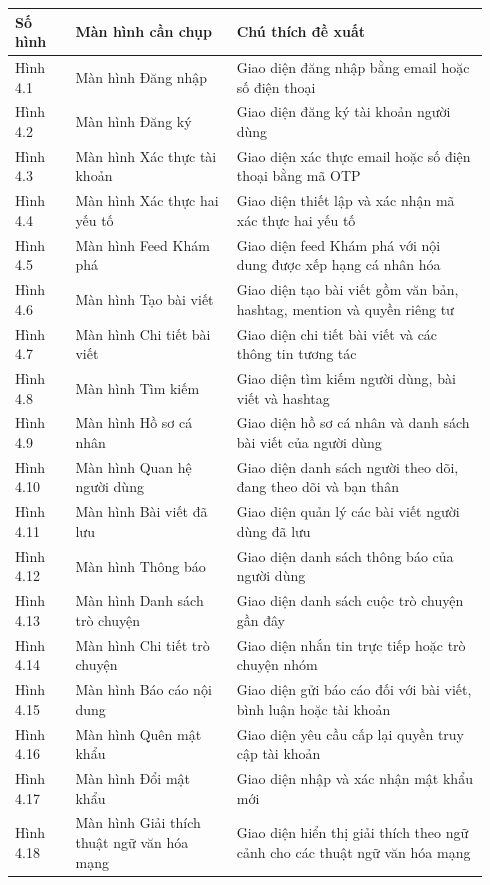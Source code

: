 {\def\LTcaptype{none}
\begin{longtable}{
  |>{\centering\arraybackslash}p{0.12\linewidth}
  |>{\raggedright\arraybackslash}p{0.32\linewidth}
  |>{\raggedright\arraybackslash}p{0.50\linewidth}|}
\hline
\textbf{Số hình} & \textbf{Màn hình cần chụp} & \textbf{Chú thích đề xuất} \\ \hline
\endhead
\hline
\endlastfoot
Hình 4.1 & Màn hình Đăng nhập & Giao diện đăng nhập bằng email hoặc số điện thoại \\ \hline
Hình 4.2 & Màn hình Đăng ký & Giao diện đăng ký tài khoản người dùng \\ \hline
Hình 4.3 & Màn hình Xác thực tài khoản & Giao diện xác thực email hoặc số điện thoại bằng mã OTP \\ \hline
Hình 4.4 & Màn hình Xác thực hai yếu tố & Giao diện thiết lập và xác nhận mã xác thực hai yếu tố \\ \hline
Hình 4.5 & Màn hình Feed Khám phá & Giao diện feed Khám phá với nội dung được xếp hạng cá nhân hóa \\ \hline
Hình 4.6 & Màn hình Tạo bài viết & Giao diện tạo bài viết gồm văn bản, hashtag, mention và quyền riêng tư \\ \hline
Hình 4.7 & Màn hình Chi tiết bài viết & Giao diện chi tiết bài viết và các thông tin tương tác \\ \hline
Hình 4.8 & Màn hình Tìm kiếm & Giao diện tìm kiếm người dùng, bài viết và hashtag \\ \hline
Hình 4.9 & Màn hình Hồ sơ cá nhân & Giao diện hồ sơ cá nhân và danh sách bài viết của người dùng \\ \hline
Hình 4.10 & Màn hình Quan hệ người dùng & Giao diện danh sách người theo dõi, đang theo dõi và bạn thân \\ \hline
Hình 4.11 & Màn hình Bài viết đã lưu & Giao diện quản lý các bài viết người dùng đã lưu \\ \hline
Hình 4.12 & Màn hình Thông báo & Giao diện danh sách thông báo của người dùng \\ \hline
Hình 4.13 & Màn hình Danh sách trò chuyện & Giao diện danh sách cuộc trò chuyện gần đây \\ \hline
Hình 4.14 & Màn hình Chi tiết trò chuyện & Giao diện nhắn tin trực tiếp hoặc trò chuyện nhóm \\ \hline
Hình 4.15 & Màn hình Báo cáo nội dung & Giao diện gửi báo cáo đối với bài viết, bình luận hoặc tài khoản \\ \hline
Hình 4.16 & Màn hình Quên mật khẩu & Giao diện yêu cầu cấp lại quyền truy cập tài khoản \\ \hline
Hình 4.17 & Màn hình Đổi mật khẩu & Giao diện nhập và xác nhận mật khẩu mới \\ \hline
Hình 4.18 & Màn hình Giải thích thuật ngữ văn hóa mạng & Giao diện hiển thị giải thích theo ngữ cảnh cho các thuật ngữ văn hóa mạng \\ \hline
\end{longtable}
}

